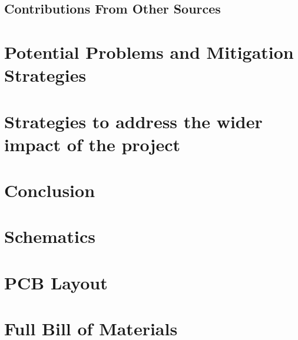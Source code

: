 \documentclass[letterpaper,12pt]{article}
\begin{document}
\subsection{Contributions From Other Sources}

\section{Potential Problems and Mitigation Strategies}
\section{Strategies to address the wider impact of the project}
\section{Conclusion}
\newpage


\newpage

\begin{appendices}
    \section{Schematics}
    \section{PCB Layout}
    \section{Full Bill of Materials}
\end{appendices}
\end{document}
